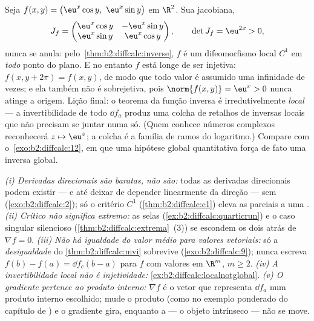 \begin{example}\label{ex:b2:diffcalc:localnotglobal}
Seja $f(x, y) = \bigl(\eu^x\cos y,\ \eu^x\sin y\bigr)$ em
$\R^2$. Sua jacobiana,
\[
J_f = \begin{pmatrix}
\eu^x\cos y & -\eu^x\sin y\\
\eu^x\sin y & \eu^x\cos y
\end{pmatrix},
\qquad
\det J_f = \eu^{2x} > 0 ,
\]
nunca se anula: pelo~\cref{thm:b2:diffcalc:inverse}, $f$ é um
difeomorfismo local $C^1$ em \emph{todo} ponto do plano.
E no entanto $f$ está longe de ser injetiva: $f(x, y + 2\pi) = f(x, y)$, de modo que
todo valor é assumido uma infinidade de vezes; e ela também não é sobrejetiva,
pois $\norm{f(x, y)} = \eu^x > 0$ nunca atinge a origem.
Lição final: o teorema da função inversa é irredutivelmente
\emph{local} --- a invertibilidade de todo $\dd f_a$ produz uma
colcha de retalhos de inversas locais que não precisam se juntar numa só.
(Quem conhece números complexos reconhecerá $z \mapsto
\eu^z$; a colcha é a família de ramos do logaritmo.)
Compare com o~\cref{exo:b2:diffcalc:12}, em que uma hipótese
global quantitativa força de fato uma inversa global.
\end{example}

\begin{remark}
\emph{(i) Derivadas direcionais são baratas,  não
são:} todas as derivadas direcionais podem existir --- e até deixar
de depender linearmente da direção --- sem
 (\cref{exo:b2:diffcalc:2}); só o critério $C^1$
(\cref{thm:b2:diffcalc:c1}) eleva as parciais a uma
. \emph{(ii) Crítico não significa extremo:}
as selas (\cref{ex:b2:diffcalc:quarticrun}) e o caso singular
silencioso (\cref{thm:b2:diffcalc:extrema}~(3)) se escondem
os dois atrás de $\nabla f = 0$. \emph{(iii) Não há igualdade do
valor médio para valores vetoriais:} só a \emph{desigualdade} do
\cref{thm:b2:diffcalc:mvi} sobrevive
(\cref{exo:b2:diffcalc:9}); nunca escreva $f(b) - f(a) = \dd
f_c(b-a)$ para $f$ com valores em $\R^m$, $m \geq 2$.
\emph{(iv) A invertibilidade local não é injetividade:}
\cref{ex:b2:diffcalc:localnotglobal}. \emph{(v) O gradiente
pertence ao produto interno:} $\nabla f$ é o vetor
que representa $\dd f_a$ num produto interno escolhido; mude o
produto (como no exemplo ponderado do capítulo de ) e o gradiente gira, enquanto a  ---
o objeto intrínseco --- não se move.
\end{remark}

